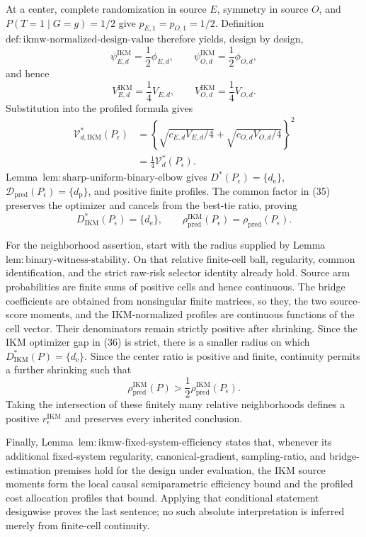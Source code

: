 At a center, complete randomization in source \(E\), symmetry in source \(O\), and \(P(T=1\mid G=g)=1/2\) give \(p_{E,1}=p_{O,1}=1/2\).  Definition~\(\mathrm{def{:}ikmw\text{-}normalized\text{-}design\text{-}value}\) therefore yields, design by design,
\[
 \psi_{E,d}^{\mathrm{IKM}}=\frac12\phi_{E,d},
 \qquad
 \psi_{O,d}^{\mathrm{IKM}}=\frac12\phi_{O,d},
\]
and hence
\[
 V_{E,d}^{\mathrm{IKM}}=\frac14V_{E,d},
 \qquad
 V_{O,d}^{\mathrm{IKM}}=\frac14V_{O,d}.
\]
Substitution into the profiled formula gives
\[
\begin{aligned}
 \mathcal V_{d,\mathrm{IKM}}^*(P_\epsilon)
 &=\left\{
 \sqrt{c_{E,d}V_{E,d}/4}+\sqrt{c_{O,d}V_{O,d}/4}
 \right\}^2\\
 &=\frac14\mathcal V_d^*(P_\epsilon).                    \tag{35}
\end{aligned}
\]
Lemma~\(\mathrm{lem{:}sharp\text{-}uniform\text{-}binary\text{-}elbow}\) gives \(D^*(P_\epsilon)=\{d_{\mathrm e}\}\), \(\mathcal D_{\mathrm{pred}}(P_\epsilon)=\{d_{\mathrm p}\}\), and positive finite profiles.  The common factor in (35) preserves the optimizer and cancels from the best-tie ratio, proving
\[
 D_{\mathrm{IKM}}^*(P_\epsilon)=\{d_{\mathrm e}\},
 \qquad
 \rho_{\mathrm{pred}}^{\mathrm{IKM}}(P_\epsilon)
 =\rho_{\mathrm{pred}}(P_\epsilon).                       \tag{36}
\]

For the neighborhood assertion, start with the radius supplied by Lemma~\(\mathrm{lem{:}binary\text{-}witness\text{-}stability}\).  On that relative finite-cell ball, regularity, common identification, and the strict raw-risk selector identity already hold.  Source arm probabilities are finite sums of positive cells and hence continuous.  The bridge coefficients are obtained from nonsingular finite matrices, so they, the two source-score moments, and the IKM-normalized profiles are continuous functions of the cell vector.  Their denominators remain strictly positive after shrinking.  Since the IKM optimizer gap in (36) is strict, there is a smaller radius on which \(D_{\mathrm{IKM}}^*(P)=\{d_{\mathrm e}\}\).  Since the center ratio is positive and finite, continuity permits a further shrinking such that
\[
 \rho_{\mathrm{pred}}^{\mathrm{IKM}}(P)
 >\frac12\rho_{\mathrm{pred}}^{\mathrm{IKM}}(P_\epsilon).
\]
Taking the intersection of these finitely many relative neighborhoods defines a positive \(r_\epsilon^{\mathrm{IKM}}\) and preserves every inherited conclusion.

Finally, Lemma~\(\mathrm{lem{:}ikmw\text{-}fixed\text{-}system\text{-}efficiency}\) states that, whenever its additional fixed-system regularity, canonical-gradient, sampling-ratio, and bridge-estimation premises hold for the design under evaluation, the IKM source moments form the local causal semiparametric efficiency bound and the profiled cost allocation profiles that bound.  Applying that conditional statement designwise proves the last sentence; no such absolute interpretation is inferred merely from finite-cell continuity.